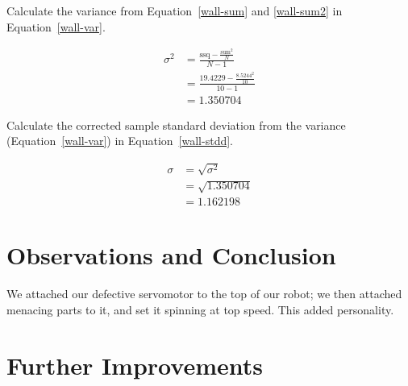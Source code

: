 \documentclass[twocolumn]{article}
\begin{document}
Calculate the variance from Equation~\ref{wall-sum} and \ref{wall-sum2} in Equation~\ref{wall-var}.

\begin{align}
\sigma^{2} &= \frac{\text{ssq} - \frac{\text{sum}^{2}}{N}}{N-1} \nonumber\\
 &= \frac{19.4229 - \frac{8.5244^2}{10}}{10-1} \nonumber\\
 &= 1.350704 \label{wall-var}
\end{align}

Calculate the corrected sample standard deviation from the variance (Equation~\ref{wall-var}) in Equation~\ref{wall-stdd}.

\begin{align}
\sigma &= \sqrt{\sigma^{2}} \nonumber\\
 &= \sqrt{1.350704} \nonumber\\
 &= 1.162198 \label{wall-stdd}
\end{align}







\section{Observations and Conclusion}

We attached our defective servomotor to the top of our robot; we then attached menacing parts to it, and set it spinning at top speed. This added personality.

\section{Further Improvements}


\end{document}
